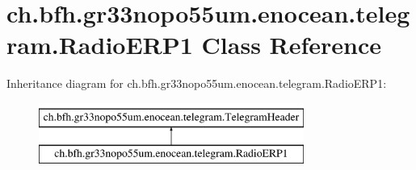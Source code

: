 \hypertarget{classch_1_1bfh_1_1gr33nopo55um_1_1enocean_1_1telegram_1_1_radio_e_r_p1}{}\section{ch.\+bfh.\+gr33nopo55um.\+enocean.\+telegram.\+Radio\+E\+R\+P1 Class Reference}
\label{classch_1_1bfh_1_1gr33nopo55um_1_1enocean_1_1telegram_1_1_radio_e_r_p1}
Inheritance diagram for ch.\+bfh.\+gr33nopo55um.\+enocean.\+telegram.\+Radio\+E\+R\+P1\+:\begin{figure}[H]
\begin{center}
\leavevmode
\includegraphics[height=2.000000cm]{classch_1_1bfh_1_1gr33nopo55um_1_1enocean_1_1telegram_1_1_radio_e_r_p1}
\end{center}
\end{figure}
